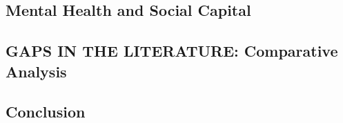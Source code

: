 \subsection{Mental Health and Social Capital}












\subsection{GAPS IN THE LITERATURE: Comparative Analysis}


\subsection{Conclusion}





